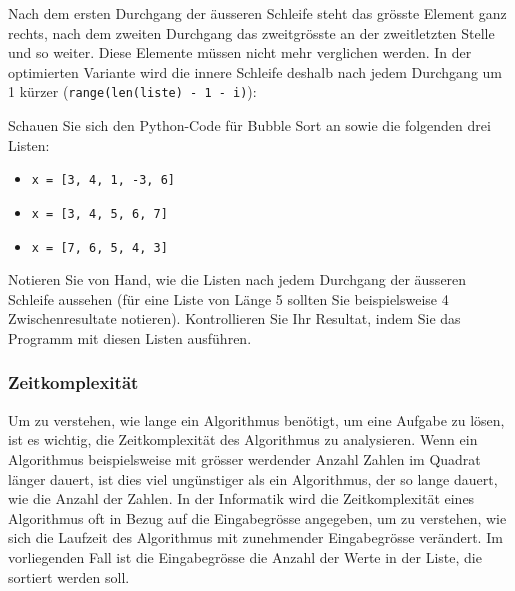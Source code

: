 Nach dem ersten Durchgang der äusseren Schleife steht das grösste Element ganz rechts, nach dem zweiten Durchgang das zweitgrösste an der zweitletzten Stelle und so weiter. Diese Elemente müssen nicht mehr verglichen werden. In der optimierten Variante wird die innere Schleife deshalb nach jedem Durchgang um 1 kürzer (\lstinline|range(len(liste) - 1 - i)|):


\begin{myexercise}
	Schauen Sie sich den Python-Code für Bubble Sort an sowie die folgenden drei Listen:
	\begin{itemize}
		\item \lstinline|x = [3, 4, 1, -3, 6]|
		\item \lstinline|x = [3, 4, 5, 6, 7]| %
		\item \lstinline|x = [7, 6, 5, 4, 3]|
	\end{itemize}
	Notieren Sie von Hand, wie die Listen nach jedem Durchgang der äusseren Schleife aussehen (für eine Liste von Länge 5 sollten Sie beispielsweise 4 Zwischenresultate notieren). Kontrollieren Sie Ihr Resultat, indem Sie das Programm mit diesen Listen ausführen.
	\begin{myanswer}
		
	\end{myanswer}
\end{myexercise}

\subsubsection{Zeitkomplexität}

Um zu verstehen, wie lange ein Algorithmus benötigt, um eine Aufgabe zu lösen, ist es wichtig, die Zeitkomplexität des Algorithmus zu analysieren. Wenn ein Algorithmus beispielsweise mit grösser werdender Anzahl Zahlen im Quadrat länger dauert, ist dies viel ungünstiger als ein Algorithmus, der so lange dauert, wie die Anzahl der Zahlen. In der Informatik wird die Zeitkomplexität eines Algorithmus oft in Bezug auf die Eingabegrösse angegeben, um zu verstehen, wie sich die Laufzeit des Algorithmus mit zunehmender Eingabegrösse verändert. Im vorliegenden Fall ist die Eingabegrösse die Anzahl der Werte in der Liste, die sortiert werden soll.

